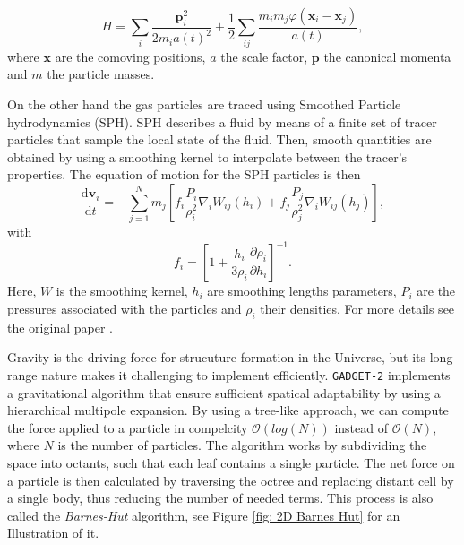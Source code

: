 \begin{equation}
        H=\sum_i\frac{\boldsymbol{p}_i^2}{2 m_i a(t)^2}+\frac12\sum_{ij}\frac{m_im_j \varphi(\boldsymbol{x}_i-\boldsymbol{x}_j)}{a(t)},
\end{equation}
where $\boldsymbol{x}$ are the comoving positions, $a$ the scale factor, $\boldsymbol{p}$ the canonical momenta and $m$ the particle masses.

On the other hand the gas particles are traced using Smoothed Particle hydrodynamics (SPH). SPH describes a fluid by means of a finite set of tracer particles that sample the local state of the fluid. Then, smooth quantities are obtained by using a smoothing kernel to interpolate between the tracer's properties. The equation of motion for the SPH particles is then
\begin{equation}
        \frac{\mathrm{d}\boldsymbol{v}_i}{\mathrm{d}t}=-\sum_{j=1}^Nm_j\left[f_i\frac{P_i}{\rho_i^2}\nabla_iW_{ij}(h_i)+f_j\frac{P_j}{\rho_j^2}\nabla_iW_{ij}(h_j)\right],
\end{equation}
with
\begin{equation}
        f_i=\left[1+\frac{h_i}{3\rho_i}\frac{\partial\rho_i}{\partial h_i}\right]^{-1}.
\end{equation}
Here, $W$ is the smoothing kernel, $h_i$ are smoothing lengths parameters, $P_i$ are the pressures associated with the particles and $\rho_i$ their densities. For more details see the original paper \cite{Springel_2005}.



Gravity is the driving force for strucuture formation in the Universe, but its long-range nature makes it challenging to implement efficiently. \texttt{GADGET-2} implements a gravitational algorithm that ensure sufficient spatical adaptability by using a hierarchical multipole expansion. By using a tree-like approach, we can compute the force applied to a particle in compelcity $\mathcal{O}(log(N))$ instead of $\mathcal{O}(N)$, where $N$ is the number of particles. The algorithm works by subdividing the space into octants, such that each leaf contains a single particle. The net force on a particle is then calculated by traversing the octree and replacing distant cell by a single body, thus reducing the number of needed terms. This process is also called the \emph{Barnes-Hut} algorithm, see Figure \ref{fig: 2D Barnes Hut} for an Illustration of it.

